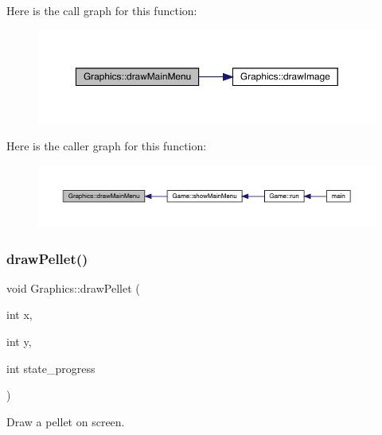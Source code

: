 Here is the call graph for this function\+:\nopagebreak
\begin{figure}[H]
\begin{center}
\leavevmode
\includegraphics[width=350pt]{class_graphics_ada6dbf202881bee3ed4bbe4ca31aecb6_cgraph}
\end{center}
\end{figure}
Here is the caller graph for this function\+:
\nopagebreak
\begin{figure}[H]
\begin{center}
\leavevmode
\includegraphics[width=350pt]{class_graphics_ada6dbf202881bee3ed4bbe4ca31aecb6_icgraph}
\end{center}
\end{figure}
\mbox{\label{class_graphics_a63bc7bf1f68cfc785f08b6863d3034d2}} 
\subsubsection{\texorpdfstring{draw\+Pellet()}{drawPellet()}}
{\footnotesize\ttfamily void Graphics\+::draw\+Pellet (\begin{DoxyParamCaption}\item[{int}]{x,  }\item[{int}]{y,  }\item[{int}]{state\+\_\+progress }\end{DoxyParamCaption})}



Draw a pellet on screen. 


